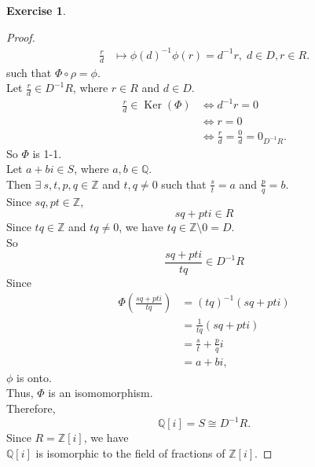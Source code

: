 \documentclass{article}
\newcommand{\bbz}{\mathbb{Z}}
\newcommand{\bbq}{\mathbb{Q}}
\renewcommand{\ker}{\operatorname{Ker}}
\theoremstyle{plain}
\theoremstyle{definition}
\newtheorem{exer}[lem]{Exercise}
\begin{document}
\begin{exer}
\begin{proof}
\begin{align*}
       \frac{r}{d} &\mapsto {\phi(d)}^{-1} \phi(r)=d^{-1}r,\; d \in D,r \in R.
   \end{align*}
   such that $\Phi\circ \rho = \phi$.\\
   Let $\frac{r}{d} \in D^{-1}R$, where $r \in R$ and $d\in D$. 
   \begin{align*}
       \frac{r}{d} \in \ker(\Phi)&\Longleftrightarrow d^{-1}r = 0 \\
       &\Longleftrightarrow r = 0 \\
       &\Longleftrightarrow \frac{r}{d} = \frac{0}{d} = 0_{D^{-1}R}.
   \end{align*}
   So $\Phi$ is 1-1.\\
   Let $a+bi \in S$, where $a,b\in \bbq$.\\
   Then $\exists \ s,t,p,q \in \bbz$ and $t,q\neq 0$ such that $\frac{s}{t} = a$ and $\frac{p}{q} = b$.\\
Since $sq,pt \in \bbz$, 
\[sq+pt i \in R\]
Since $tq \in \bbz$ and $tq \neq 0$, we have $tq \in \bbz\setminus 0 = D$.\\
So 
\[\frac{sq+pti}{tq} \in D^{-1}R\]
Since
\begin{align*}
    \Phi\left(\frac{sq+pti}{tq}\right) &= (tq)^{-1}(sq+pti) \\
    &=\frac{1}{tq}(sq+pti) \\
    &=\frac{s}{t}+\frac{p}{q}i \\
    &= a+bi,
\end{align*}
   $\phi$ is onto.\\
   Thus, $\Phi$ is an isomomorphism.\\
   Therefore, \[\bbq[i]= S \cong D^{-1}R.\]
   Since $R = \bbz[i]$, we have\\
   $\bbq[i]$ is isomorphic to the field of fractions of $\bbz[i]$.
\end{proof}

\end{exer}
\end{document}
